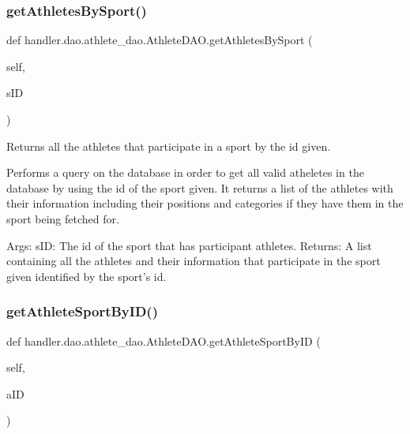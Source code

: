 \subsubsection{\texorpdfstring{get\+Athletes\+By\+Sport()}{getAthletesBySport()}}
{\footnotesize\ttfamily def handler.\+dao.\+athlete\+\_\+dao.\+Athlete\+D\+A\+O.\+get\+Athletes\+By\+Sport (\begin{DoxyParamCaption}\item[{}]{self,  }\item[{}]{s\+ID }\end{DoxyParamCaption})}

\begin{DoxyVerb}Returns all the athletes that participate in a sport by
the id given.

Performs a query on the database in order to get all
valid atheletes in the database by using the id of the 
sport given. It returns a list of the athletes with their 
information including their positions and categories if
they have them in the sport being fetched for.

Args:
    sID: The id of the sport that has participant athletes.
Returns:
    A list containing all the athletes and their  
    information that participate in the sport given
    identified by the sport's id.\end{DoxyVerb}
 \mbox{\label{classhandler_1_1dao_1_1athlete__dao_1_1_athlete_d_a_o_a95876679c31686ed6516687c82d3df6f}} 
\subsubsection{\texorpdfstring{get\+Athlete\+Sport\+By\+I\+D()}{getAthleteSportByID()}}
{\footnotesize\ttfamily def handler.\+dao.\+athlete\+\_\+dao.\+Athlete\+D\+A\+O.\+get\+Athlete\+Sport\+By\+ID (\begin{DoxyParamCaption}\item[{}]{self,  }\item[{}]{a\+ID }\end{DoxyParamCaption})}

